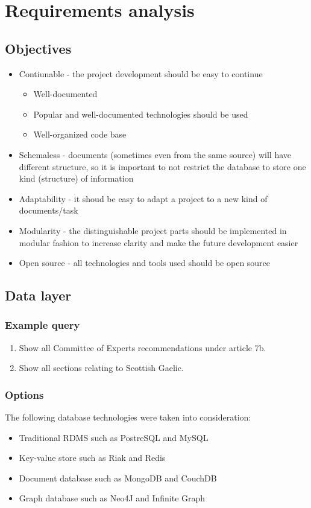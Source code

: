 \documentclass[11pt, a4paper]{report}
\begin{document}

\chapter{Requirements analysis}

\section{Objectives}
\begin{itemize}
  \item Contiunable - the project development should be easy to continue
    \begin{itemize}
      \item Well-documented
      \item Popular and well-documented technologies should be used
      \item Well-organized code base
    \end{itemize}
  \item Schemaless - documents (sometimes even from the same source) will have different structure, so it is important to not restrict the database to store one kind (structure) of information
  \item Adaptability - it shoud be easy to adapt a project to a new kind of documents/task
  \item Modularity - the distinguishable project parts should be implemented in modular fashion to increase clarity and make the future development easier
  \item Open source - all technologies and tools used should be open source
\end{itemize}

\section{Data layer}
\subsection{Example query}
\begin{enumerate}
  \item Show all Committee of Experts recommendations under article 7b.
  \item Show all sections relating to Scottish Gaelic.
\end{enumerate}

\subsection{Options}
The following database technologies were taken into consideration:
\begin{itemize}
  \item Traditional RDMS such as PostreSQL and MySQL
  \item Key-value store such as Riak and Redis
  \item Document database such as MongoDB and CouchDB
  \item Graph database such as Neo4J and Infinite Graph
\end{itemize}
\end{document}
